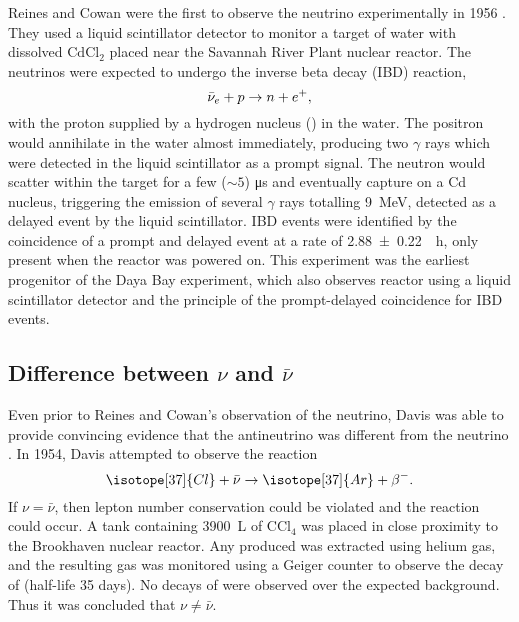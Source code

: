 Reines and Cowan were the first to observe the neutrino experimentally in 1956
\cite{reines_cowan}.
They used a liquid scintillator detector to monitor a target of
water with dissolved $\text{CdCl}_2$
placed near the Savannah River Plant nuclear reactor.
The neutrinos were expected to undergo the inverse beta decay (IBD) reaction,
\begin{equation}\label{eq:ibd}
    \bar{\nu}_e + p \to n + e^+,
\end{equation}
with the proton supplied by a hydrogen nucleus () in the water.
The positron would annihilate in the water almost immediately,
producing two $\gamma$ rays which were detected in the liquid scintillator
as a prompt signal.
The neutron would scatter within the target for a few ($\sim5$) \si{\us}
and eventually capture on a Cd nucleus,
triggering the emission of several $\gamma$ rays totalling \SI{9}{\MeV},
detected as a delayed event by the liquid scintillator.
IBD events were identified by the coincidence of a prompt and delayed event
at a rate of \SI[per-mode=reciprocal]{2.88\pm0.22}{\per\hour},
only present when the reactor was powered on.
This experiment was the earliest progenitor of the Daya Bay experiment,
which also observes reactor \nuebar{} using a liquid scintillator detector
and the principle of the prompt-delayed coincidence for IBD events.

\subsection{Difference between \texorpdfstring{$\nu$ and $\bar{\nu}$}{nu and nu-bar}}
\label{subsec:nu_vs_nubar}

Even prior to Reines and Cowan's observation of the neutrino,
Davis was able to provide convincing evidence that
the antineutrino was different from the neutrino \cite{davis_diff_nuebar}.
In 1954, Davis attempted to observe the reaction
\begin{equation}\label{eq:davis_nubar}
    \isotope[37]{Cl} + \bar{\nu} \to \isotope[37]{Ar} + \beta^-.
\end{equation}
If $\nu=\bar{\nu}$, then lepton number conservation could be violated
and the reaction could occur.
A tank containing \SI{3900}{\liter} of $\text{CCl}_4$
was placed in close proximity to the Brookhaven nuclear reactor.
Any  produced was extracted using helium gas,
and the resulting gas was monitored using a Geiger counter
to observe the decay of  (half-life 35 days).
No decays of  were observed over the expected background.
Thus it was concluded that $\nu\neq\bar{\nu}$.

